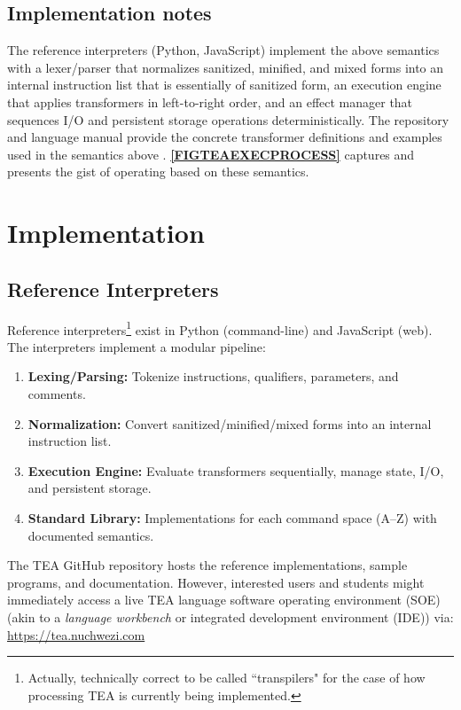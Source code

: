 \documentclass[sigplan,screen]{acmart}
\begin{document}
\subsection{Implementation notes}

The reference interpreters (Python, JavaScript) implement the above semantics with a lexer/parser that normalizes sanitized, minified, and mixed forms into an internal instruction list that is essentially of sanitized form, an execution engine that applies transformers in left-to-right order, and an effect manager that sequences I/O and persistent storage operations deterministically.  The repository and language manual provide the concrete transformer definitions and examples used in the semantics above \cite{cli_tttt,Lutalo2024TEATAZ}. \textbf{\autoref{FIGTEAEXECPROCESS}} captures and presents the gist of operating based on these semantics.



\section{Implementation}
\label{SEC4}

\subsection{Reference Interpreters}
Reference interpreters\footnote{Actually, technically correct to be called ``transpilers" for the case of how processing TEA is currently being implemented.} exist in Python (command-line) and JavaScript (web). The interpreters implement a modular pipeline:
\begin{enumerate}
  \item \textbf{Lexing/Parsing:} Tokenize instructions, qualifiers, parameters, and comments.
  \item \textbf{Normalization:} Convert sanitized/minified/mixed forms into an internal instruction list.
  \item \textbf{Execution Engine:} Evaluate transformers sequentially, manage state, I/O, and persistent storage.
  \item \textbf{Standard Library:} Implementations for each command space (A–Z) with documented semantics.
\end{enumerate}

The TEA GitHub repository hosts the reference implementations, sample programs, and documentation. However, interested users and students might immediately access a live TEA language software operating environment (SOE) \cite{lutalo2023dnapsoe} (akin to a \textit{language workbench} or integrated development environment (IDE)) via: \url{https://tea.nuchwezi.com}
\end{document}
